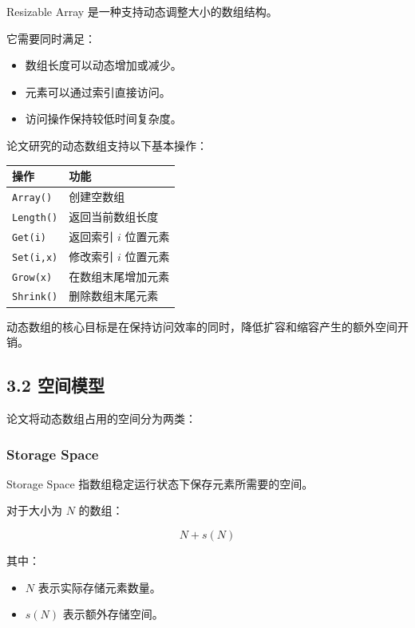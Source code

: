 \documentclass[
  UTF8,
  a4paper,
  12pt]{ctexart}
\newcounter{none} %
\providecommand{\tightlist}{%
  \setlength{\itemsep}{0pt}\setlength{\parskip}{0pt}}
\begin{document}
Resizable Array 是一种支持动态调整大小的数组结构。

它需要同时满足：

\begin{itemize}
\tightlist
\item
  数组长度可以动态增加或减少。
\item
  元素可以通过索引直接访问。
\item
  访问操作保持较低时间复杂度。
\end{itemize}

论文研究的动态数组支持以下基本操作：

{\def\LTcaptype{none} %
\begin{longtable}[]{@{}ll@{}}
\toprule\noalign{}
操作 & 功能 \\
\midrule\noalign{}
\endhead
\bottomrule\noalign{}
\endlastfoot
\texttt{Array()} & 创建空数组 \\
\texttt{Length()} & 返回当前数组长度 \\
\texttt{Get(i)} & 返回索引 \(i\) 位置元素 \\
\texttt{Set(i,x)} & 修改索引 \(i\) 位置元素 \\
\texttt{Grow(x)} & 在数组末尾增加元素 \\
\texttt{Shrink()} & 删除数组末尾元素 \\
\end{longtable}
}

动态数组的核心目标是在保持访问效率的同时，降低扩容和缩容产生的额外空间开销。

\subsection{3.2 空间模型}\label{ux7a7aux95f4ux6a21ux578b}

论文将动态数组占用的空间分为两类：

\subsubsection{Storage Space}\label{storage-space}

Storage Space 指数组稳定运行状态下保存元素所需要的空间。

对于大小为 \(N\) 的数组：

\[
N+s(N)
\]

其中：

\begin{itemize}
\tightlist
\item
  \(N\) 表示实际存储元素数量。
\item
  \(s(N)\) 表示额外存储空间。
\end{itemize}
\end{document}
